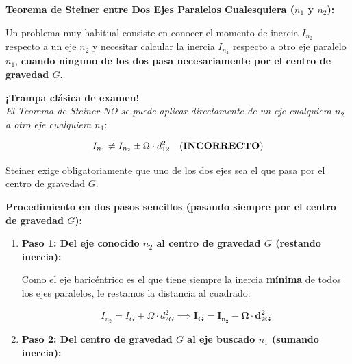 \begin{ImportanteBox}

    \textbf{Teorema de Steiner entre Dos Ejes Paralelos Cualesquiera ($n_1$ y $n_2$):}



    Un problema muy habitual consiste en conocer el momento de inercia $I_{n_2}$ respecto a un eje $n_2$ y necesitar calcular la inercia $I_{n_1}$ respecto a otro eje paralelo $n_1$, \textbf{cuando ninguno de los dos pasa necesariamente por el centro de gravedad $G$}.



    \begin{center}

        \textbf{¡Trampa clásica de examen!}\\

        \textit{El Teorema de Steiner NO se puede aplicar directamente de un eje cualquiera $n_2$ a otro eje cualquiera $n_1$}:

        \begin{equation}
            I_{n_1} \ne I_{n_2} \pm \Omega \cdot d_{12}^2 \quad \text{(\textbf{INCORRECTO})}
\end{equation}

        Steiner exige obligatoriamente que uno de los dos ejes sea el que pasa por el centro de gravedad $G$.

    \end{center}



    \textbf{Procedimiento en dos pasos sencillos (pasando siempre por el centro de gravedad $G$):}

    \begin{enumerate}

        \item \textbf{Paso 1: Del eje conocido $n_2$ al centro de gravedad $G$ (restando inercia):}

              Como el eje baricéntrico es el que tiene siempre la inercia \textbf{mínima} de todos los ejes paralelos, le restamos la distancia al cuadrado:

              \begin{equation}
                  I_{n_2} = I_G + \Omega \cdot d_{2G}^2 \implies \mathbf{I_G = I_{n_2} - \Omega \cdot d_{2G}^2}
\end{equation}

        \item \textbf{Paso 2: Del centro de gravedad $G$ al eje buscado $n_1$ (sumando inercia):}


\end{enumerate}
\end{ImportanteBox}

